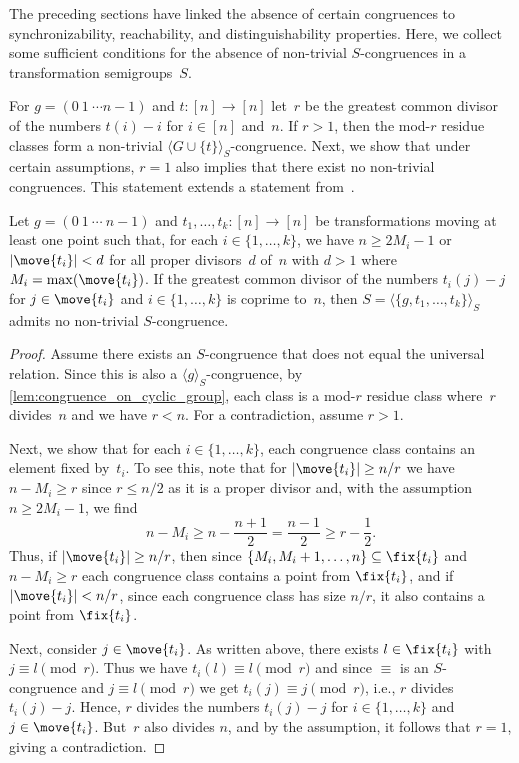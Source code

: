 
The preceding sections have linked the absence of certain congruences to synchronizability, reachability, and distinguishability
properties. Here, we collect some sufficient conditions for the absence of non-trivial $S$-congruences
in a transformation semigroups~$S$.

For $g = (0 ~ 1 ~ \cdots n - 1)$ and $t \colon [n] \to [n]$
let~$r$ be the greatest common divisor of the numbers $t(i) - i$
for $i \in [n]$ and~$n$.
If $r > 1$, then the mod-$r$ residue classes form a non-trivial $\langle G \cup \{t\} \rangle_S$-congruence.
Next, we show that under certain assumptions,
$r = 1$ also implies that there exist no non-trivial congruences.
This statement extends a statement from~\cite[Lem.~3]{HeathIKS09}.

\begin{proposition} \label{syncmax:primitive:prop:circular-primitive}
	Let $g = (0 ~ 1 ~ \cdots ~ n - 1)$
	and $t_1, \ldots, t_k \colon [n] \to [n]$
	be transformations moving at least one point such that,
	for each $i \in \{1,\ldots,k\}$, we have
	$n \ge 2 M_i - 1$
	or $|\move{t_i}| < d$ for all proper divisors~$d$ of~$n$ with $d > 1$
	where $M_i= \max(\move{t_i})$.
	If the greatest common divisor
	of the numbers $t_i(j) - j$
	for $j \in \move{t_i}$ and $i \in \{1,\ldots,k\}$
	is coprime to~$n$,
	then $S = \langle \{g,t_1,\ldots,t_k\} \rangle_S$
	admits no non-trivial $S$-congruence.
\end{proposition}
\begin{proof}
	Assume there exists an $S$-congruence
	that does not equal the universal relation.
	Since this is also a $\langle g \rangle_S$-congruence,
	by \cref{lem:congruence_on_cyclic_group}, each class
	is a mod-$r$ residue class where~$r$ divides~$n$
	and we have $r < n$. For a contradiction, assume $r > 1$.
	
	Next, we show that for each $i \in \{1,\ldots,k\}$, 
	each congruence class contains an element fixed by~$t_i$. 
	To see this, note that for $|\move{t_i}| \ge n/r$
	we have $n - M_i \ge r$ since $r \le n/2$ as it is a proper divisor
	and, with the assumption $n \ge 2 M_i - 1$, we find
	\[
	n - M_i
	\ge n - \frac{n + 1}{2}
	= \frac{n - 1}{2}
	\ge r - \frac{1}{2}.
	\]
	Thus, if $|\move{t_i}| \ge n / r$,
	then since $\{M_i, M_i + 1, \ldots, n\} \subseteq \fix{t_i}$
	and $n - M_i \ge r$ each congruence class
	contains a point from $\fix{t_i}$, and
	if $|\move{t_i}| < n / r$, since each congruence class has size $n / r$,
	it also contains a point from $\fix{t_i}$.
	
	Next, consider $j \in \move{t_i}$.
	As written above, there exists $l \in \fix{t_i}$
	with $j \equiv l \pmod{r}$.
	Thus we have $t_i(l) \equiv l \pmod{r}$
	and since $\equiv$ is an $S$-congruence
	and $j \equiv l \pmod{r}$
	we get $t_i(j) \equiv j \pmod{r}$, i.e.,
	$r$ divides $t_i(j) - j$.
	Hence, $r$ divides the numbers $t_i(j) - j$ for $i \in \{1,\ldots,k\}$
	and $j \in \move{t_i}$.
	But~$r$ also divides $n$, and by the assumption,
	it follows that $r = 1$, giving a contradiction.	
\end{proof}

